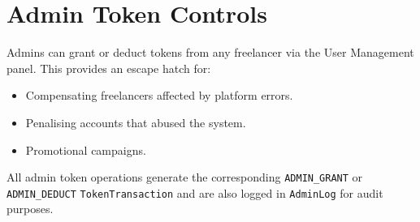 \section{Admin Token Controls}

Admins can grant or deduct tokens from any freelancer via the User Management panel. This provides an escape hatch for:

\begin{itemize}
  \item Compensating freelancers affected by platform errors.
  \item Penalising accounts that abused the system.
  \item Promotional campaigns.
\end{itemize}

All admin token operations generate the corresponding \texttt{ADMIN\_GRANT} or \texttt{ADMIN\_DEDUCT} \texttt{TokenTransaction} and are also logged in \texttt{AdminLog} for audit purposes.
